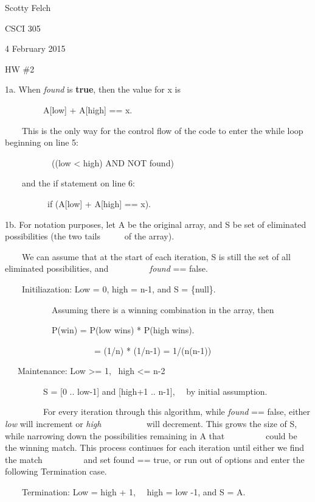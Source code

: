 \documentclass{article}
\newcommand{\tmem}[1]{{\em #1\/}}
\newcommand{\tmstrong}[1]{\textbf{#1}}
\begin{document}
Scotty Felch

CSCI 305

4 February 2015

HW \#2



1a. When {\tmem{found}} is {\tmstrong{true}}, then the value for x is

\ \ \ \ \ \ \ \ \ A[low] + A[high] == x.

\ \ \ \ This is the only way for the control flow of the code to enter the
while loop beginning on line 5:

\ \ \ \ \ \ \ \ \ \ \ ((low < high) AND NOT found)

\ \ \ \ and the if statement on line 6:

\ \ \ \ \ \ \ \ \ \ if (A[low] + A[high] == x).



1b. For notation purposes, let A be the original array, and S be set of
eliminated possibilities (the two tails \ \ \ \ \ of the array).

\ \ \ \ We can assume that at the start of each iteration, S is still the set
of all eliminated possibilities, and \ \ \ \ \ \ \ \ \ {\tmem{found}} ==
false.

\ \ \ \ Initiliazation: Low = 0, high = n-1, and S = \{null\}.

\ \ \ \ \ \ \ \ \ \ \ Assuming there is a winning combination in the array,
then

\ \ \ \ \ \ \ \ \ \ \ P(win) = P(low wins) * P(high wins).

\ \ \ \ \ \ \ \ \ \ \ \ \ \ \ \ \ \ \ \ \ = (1/n) * (1/n-1) = 1/(n(n-1))

\ \ \ Maintenance: Low >= 1, \ high <= n-2

\ \ \ \ \ \ \ \ \ S = [0 .. low-1] and [high+1 .. n-1], \ \ by initial
assumption.

\ \ \ \ \ \ \ \ \ For every iteration through this algorithm, while
{\tmem{found}} == false, either {\tmem{low}} will increment or {\tmem{high}} \
\ \ \ \ \ \ \ \ \ will decrement. This grows the size of S, while narrowing
down the possibilities remaining in A that \ \ \ \ \ \ \ \ \ could be the
winning match. This process continues for each iteration until either we find
the match \ \ \ \ \ \ \ \ \ and set found == true, or run out of options and
enter the following Termination case.



\ \ \ \ Termination: Low = high + 1, \ \ high = low -1, and S = A.
\end{document}

